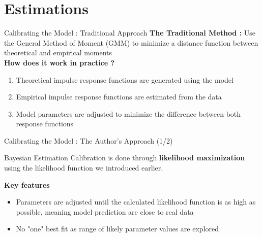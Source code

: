 \documentclass{beamer}
\begin{document}
			
\section{Estimations} 
			
\begin{frame}{Calibrating the Model : Traditional Approach}		
\textbf{The Traditional Method :}
Use the General Method of Moment (GMM) to minimize a distance function between theoretical and empirical moments \\
\vspace{0.1cm}
\textbf{How does it work in practice ?}
\begin{enumerate}
    \item Theoretical impulse response functions are generated using the model 
    \item Empirical impulse response functions are estimated from the data
    \item Model parameters are adjusted to minimize the difference between both response functions
\end{enumerate}

\end{frame}

\begin{frame}{Calibrating the Model : The Author's Approach (1/2)}	
\begin{simplebox}{Bayesian Estimation}
Calibration is done through \textbf{likelihood maximization} using the likelihood function we introduced earlier. 
\end{simplebox}

\vspace{0.1cm}
\textbf{Key features}
\begin{itemize}
    \item Parameters are adjusted until the calculated likelihood function is as high as possible, meaning model prediction are close to real data
    \item No "one" best fit as range of likely parameter values are explored 
\end{itemize}
\end{frame}
\end{document}
